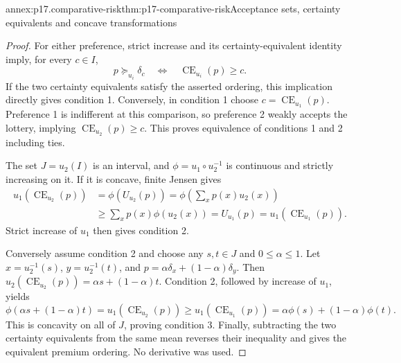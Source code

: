 \begin{annexitem}{annex:p17.comparative-risk}{thm:p17-comparative-risk}{Acceptance sets, certainty equivalents and concave transformations}
\begin{proof}
For either preference, strict increase and its certainty-equivalent
identity imply, for every \(c\in I\),
\[
                  p\succeq_{u_i}\delta_c
                  \quad\Longleftrightarrow\quad
                  \operatorname{CE}_{u_i}(p)\geq c.
\]
If the two certainty equivalents satisfy the asserted ordering,
this implication directly gives condition 1. Conversely, in
condition 1 choose \(c=\operatorname{CE}_{u_1}(p)\). Preference 1
is indifferent at this comparison, so preference 2 weakly accepts
the lottery, implying \(\operatorname{CE}_{u_2}(p)\geq c\).
This proves equivalence of conditions 1 and 2 including ties.

The set \(J=u_2(I)\) is an interval, and
\(\phi=u_1\circ u_2^{-1}\) is continuous and strictly increasing
on it. If it is concave, finite Jensen gives
\[
\begin{aligned}
 u_1(\operatorname{CE}_{u_2}(p))
 &=\phi(U_{u_2}(p))
  =\phi\left(\sum_xp(x)u_2(x)\right)\\
 &\geq\sum_xp(x)\phi(u_2(x))
  =U_{u_1}(p)
  =u_1(\operatorname{CE}_{u_1}(p)).
\end{aligned}
\]
Strict increase of \(u_1\) then gives condition 2.

Conversely assume condition 2 and choose any \(s,t\in J\) and
\(0\leq\alpha\leq1\). Let \(x=u_2^{-1}(s)\),
\(y=u_2^{-1}(t)\), and \(p=\alpha\delta_x+(1-\alpha)\delta_y\).
Then \(u_2(\operatorname{CE}_{u_2}(p))=\alpha s+(1-\alpha)t\).
Condition 2, followed by increase of \(u_1\), yields
\[
 \phi(\alpha s+(1-\alpha)t)
 =u_1(\operatorname{CE}_{u_2}(p))
 \geq u_1(\operatorname{CE}_{u_1}(p))
 =\alpha\phi(s)+(1-\alpha)\phi(t).
\]
This is concavity on all of \(J\), proving condition 3. Finally,
subtracting the two certainty equivalents from the same mean
reverses their inequality and gives the equivalent premium ordering.
No derivative was used.
\end{proof}
\end{annexitem}

